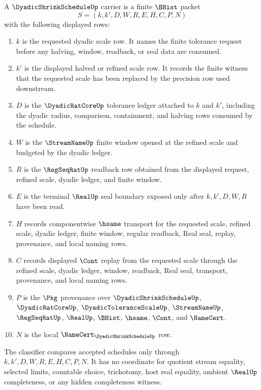 \begin{definition}
\label{def:dyadic-shrink-schedule-carrier}
A $\DyadicShrinkScheduleUp$ carrier is a finite $\BHist$ packet
$$
S=(k,k',D,W,R,E,H,C,P,N)
$$
with the following displayed rows:
\begin{enumerate}
\item $k$ is the requested dyadic scale row. It names the finite tolerance request before any halving, window, readback, or seal data are consumed.
\item $k'$ is the displayed halved or refined scale row. It records the finite witness that the requested scale has been replaced by the precision row used downstream.
\item $D$ is the $\DyadicRatCoreUp$ tolerance ledger attached to $k$ and $k'$, including the dyadic radius, comparison, containment, and halving rows consumed by the schedule.
\item $W$ is the $\StreamNameUp$ finite window opened at the refined scale and budgeted by the dyadic ledger.
\item $R$ is the $\RegSeqRatUp$ readback row obtained from the displayed request, refined scale, dyadic ledger, and finite window.
\item $E$ is the terminal $\RealUp$ seal boundary exposed only after $k,k',D,W,R$ have been read.
\item $H$ records componentwise $\hsame$ transport for the requested scale, refined scale, dyadic ledger, finite window, regular readback, Real seal, replay, provenance, and local naming rows.
\item $C$ records displayed $\Cont$ replay from the requested scale through the refined scale, dyadic ledger, window, readback, Real seal, transport, provenance, and local naming rows.
\item $P$ is the $\Pkg$ provenance over $\DyadicShrinkScheduleUp$, $\DyadicRatCoreUp$, $\DyadicToleranceScaleUp$, $\StreamNameUp$, $\RegSeqRatUp$, $\RealUp$, $\BHist$, $\hsame$, $\Cont$, and $\NameCert$.
\item $N$ is the local $\NameCert_{\DyadicShrinkScheduleUp}$ row.
\end{enumerate}
The classifier compares accepted schedules only through $k,k',D,W,R,E,H,C,P,N$. It has no coordinate for quotient stream equality, selected limits, countable choice, trichotomy, host real equality, ambient $\RealUp$ completeness, or any hidden completeness witness.
\end{definition}

